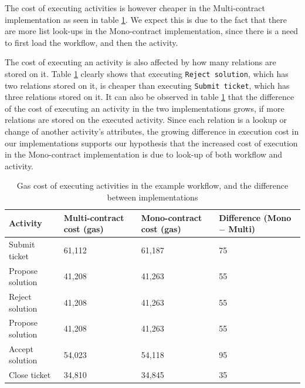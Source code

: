 \documentclass{article}
\begin{document}
	The cost of executing activities is however cheaper in the Multi-contract implementation as seen in table \ref{tab:cost-of-executing-activities}.
	We expect this is due to the fact that there are more list look-ups in the Mono-contract implementation, since there is a need to first load the workflow, and then the activity.

	The cost of executing an activity is also affected by how many relations are stored on it. 
	Table \ref{tab:cost-of-executing-activities} clearly shows that executing \texttt{Reject solution}, which has two relations stored on it, is cheaper than executing \texttt{Submit ticket}, which has three relations stored on it.
	It can also be observed in table \ref{tab:cost-of-executing-activities} that the difference of the cost of executing an activity in the two implementations grows, if more relations are stored on the executed activity.
	Since each relation is a lookup or change of another activity's attributes, the growing difference in execution cost in our implementations supports our hypothesis that the increased cost of execution in the Mono-contract implementation is due to look-up of both workflow and activity.

	\begin{table}[!ht]
		\centering
		\label{tab:cost-of-executing-activities}
		\begin{tabular}{|p{3cm}|p{2.5cm}|p{2.5cm}|p{2.5cm}|}
			\hline
			Activity                     & Multi-contract cost (gas) & Mono-contract cost (gas) & Difference (Mono $-$ Multi) \\\hline
			Submit ticket                & 61,112          			 & 61,187         			& 75         \\\hline
			Propose solution             & 41,208          			 & 41,263         			& 55         \\\hline
			Reject solution              & 41,208          			 & 41,263         			& 55         \\\hline
			Propose solution             & 41,208          			 & 41,263         			& 55         \\\hline
			Accept solution              & 54,023          			 & 54,118         			& 95         \\\hline
			Close ticket                 & 34,810          			 & 34,845         			& 35         \\\hline
		\end{tabular}
		\caption{Gas cost of executing activities in the example workflow, and the difference between implementations}
	\end{table}
\end{document}
